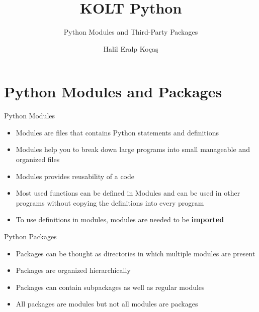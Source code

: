 
\usepackage{../KU-Beamer-Template/style/koc} 
\usepackage{minted}
\usepackage{upquote}
\usepackage{graphicx}

\title{KOLT Python}
\subtitle{Python Modules and Third-Party Packages} 
\date{}
\author{Halil Eralp Koçaş}




    \maketitle


    \section{Python Modules and Packages}

    \begin{frame}{Python Modules}
        \LARGE
        \begin{itemize}
            \item Modules are files that contains Python statements and definitions
            \pause
            \item Modules help you to break down large programs into small manageable and organized files
            \pause
            \item Modules provides reusability of a code
            \pause
            \item Most used functions can be defined in Modules and can be used in other programs without copying the definitions into every program
            \pause
            \item To use definitions in modules, modules are needed to be \textbf{imported}
        \end{itemize}
    \end{frame}
     
    \begin{frame}{Python Packages}
        \LARGE
        \begin{itemize}
            \item Packages can be thought as directories in which multiple modules are present
            \pause
            \item Packages are organized hierarchically
            \pause
            \item Packages can contain subpackages as well as regular modules
            \pause
            \item All packages are modules but not all modules are packages
            
        \end{itemize}
    \end{frame}

